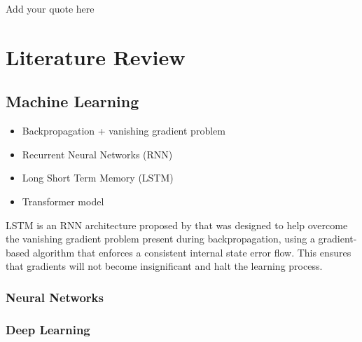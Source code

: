 \begin{savequote}[75mm]
Add your quote here
\end{savequote}

\chapter{Literature Review}
\label{literature}

\clearpage


\section{Machine Learning}




\begin{itemize}
    \item Backpropagation + vanishing gradient problem
    \item Recurrent Neural Networks (RNN)
    \item Long Short Term Memory (LSTM)
    \item Transformer model
\end{itemize}

\acrfull{LSTM} is an \acrshort{RNN} architecture proposed by \cite{hochreiter_long_1997} that was designed to help overcome the vanishing gradient problem present during backpropagation, using a gradient-based algorithm that enforces a consistent internal state error flow. This ensures that gradients will not become insignificant and halt the learning process.

\subsection{Neural Networks}

\subsection{Deep Learning}

